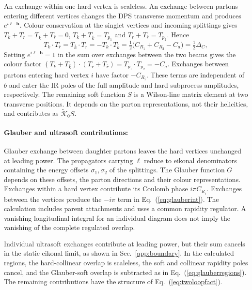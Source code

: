 \documentclass[%
 onecolumn,
 superscriptaddress,
 preprintnumbers,
 nofootinbib,
 amsmath,amssymb,
 aps,
 prl,
]{revtex4-2}
\newcommand{\bb}{\boldsymbol b}
\newcommand{\DD}{\Delta_C}
\begin{document}
An exchange within one hard vertex is
scaleless. An exchange between partons
entering different vertices changes the
DPS transverse momentum and produces
$e^{i\boldsymbol\ell\cdot\bb}$.
Colour conservation at the singlet vertices
and incoming splittings gives
$T_k+T_r=T_{\bar k}+T_{\bar r}=0$,
$T_k+T_{\bar k}=T_{p_1}$ and
$T_r+T_{\bar r}=T_{p_2}$. Hence
\begin{equation}
T_k\cdot T_{\bar r}=T_{\bar k}\cdot T_r=-T_k\cdot T_{\bar k}=\tfrac12\big(C_{R_1}+C_{R_2}-C_a\big)=\tfrac12\DD ,
\label{eq:softcolour}
\end{equation}
Setting $e^{i\boldsymbol\ell\cdot\bb}=1$
in the sum over exchanges between the two
beams gives the colour factor
$(T_k+T_{\bar k})\cdot(T_r+T_{\bar r})
=T_{p_1}\cdot T_{p_2}=-C_a$.
Exchanges between partons entering
hard vertex $i$ have factor $-C_{R_i}$.
These terms are independent of $b$ and
enter the IR poles of the full amplitude
and hard subprocess amplitudes,
respectively.
The remaining soft function $S$ is a
Wilson-line matrix element at two
transverse positions. It depends on the
parton representations, not their helicities,
and contributes as $\widetilde{\mathcal K}_0S$.

\paragraph{Glauber and ultrasoft contributions: }
Glauber exchange between daughter partons
leaves the hard vertices unchanged at
leading power. The propagators carrying
$\ell$ reduce to eikonal denominators
containing the energy offsets
$\sigma_1,\sigma_2$ of the splittings.
The Glauber function $G$ depends on these
offsets, the parton directions and their
colour representations.
%
Exchanges within a hard vertex contribute
its Coulomb phase $i\pi C_{R_i}$.
Exchanges between the vertices produce
the $-i\pi$ term in
Eq.~(\ref{eq:glauberint}).
The calculation includes parent attachments
and uses a common rapidity regulator.
A vanishing longitudinal integral for an
individual diagram does not imply the
vanishing of the complete regulated overlap.

Individual ultrasoft exchanges contribute
at leading power, but their sum cancels in
the static eikonal limit, as shown in
Sec.~\ref{app:boundary}.
In the calculated regions, the
hard-collinear overlap is scaleless,
the soft and collinear rapidity poles cancel,
and the Glauber-soft overlap is subtracted
as in Eq.~(\ref{eq:glauberregions}).
The remaining contributions have the
structure of Eq.~(\ref{eq:twoloopfact}).
\end{document}
